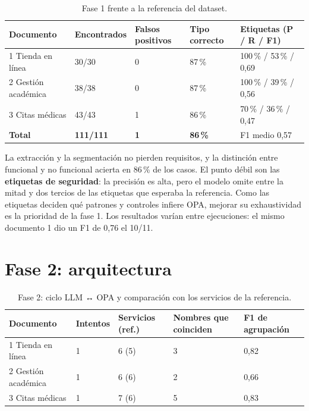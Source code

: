 \documentclass[11pt,a4paper]{report}
\begin{document}
\begin{table}[H]
\centering
\caption{Fase 1 frente a la referencia del dataset.}
\begin{tabularx}{\textwidth}{@{}LC{1.9cm}C{1.6cm}C{1.9cm}C{3.4cm}@{}}
\toprule
\textbf{Documento} & \textbf{Encontrados} & \textbf{Falsos positivos} & \textbf{Tipo correcto} & \textbf{Etiquetas (P / R / F1)}\\
 Tienda en línea & 30/30 & 0 & 87\,\% & 100\,\% / 53\,\% / 0,69\\
2 Gestión académica & 38/38 & 0 & 87\,\% & 100\,\% / 39\,\% / 0,56\\
3 Citas médicas & 43/43 & 1 & 86\,\% & 70\,\% / 36\,\% / 0,47\\
\midrule
\textbf{Total} & \textbf{111/111} & \textbf{1} & \textbf{86\,\%} & F1 medio 0,57\\
\bottomrule
\end{tabularx}
\end{table}

La extracción y la segmentación no pierden requisitos, y la distinción entre funcional y no
funcional acierta en 86\,\% de los casos. El punto débil son las \textbf{etiquetas de seguridad}:
la precisión es alta, pero el modelo omite entre la mitad y dos tercios de las etiquetas que
esperaba la referencia. Como las etiquetas deciden qué patrones y controles infiere OPA, mejorar su
exhaustividad es la prioridad de la fase 1. Los resultados varían entre ejecuciones: el mismo
documento 1 dio un F1 de 0,76 el 10/11.

\section{Fase 2: arquitectura}

\begin{table}[H]
\centering
\caption{Fase 2: ciclo LLM ↔ OPA y comparación con los servicios de la referencia.}
\begin{tabularx}{\textwidth}{@{}LC{1.7cm}C{1.9cm}C{2.4cm}C{2.4cm}@{}}
\toprule
\textbf{Documento} & \textbf{Intentos} & \textbf{Servicios (ref.)} & \textbf{Nombres que coinciden} & \textbf{F1 de agrupación}\\
 Tienda en línea & 1 & 6 (5) & 3 & 0,82\\
2 Gestión académica & 1 & 6 (6) & 2 & 0,66\\
3 Citas médicas & 1 & 7 (6) & 5 & 0,83\\
\bottomrule
\end{tabularx}
\end{table}
\end{document}
